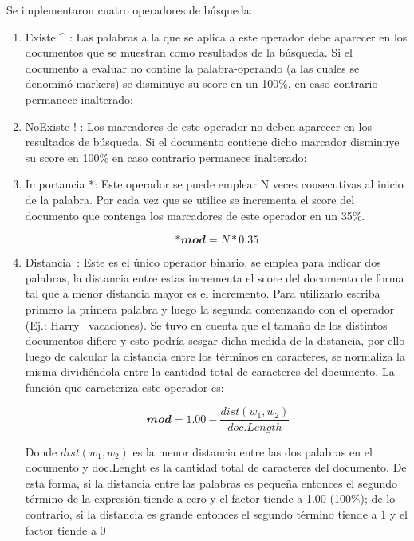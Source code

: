 \documentclass[a4paper,12pt,twocolumn]{article}
\begin{document}
Se implementaron cuatro operadores de búsqueda:
\begin{enumerate}
    \item  Existe ^ : Las palabras a la que se aplica a este operador debe aparecer en los
    documentos que se muestran como resultados de la búsqueda. Si el documento a
    evaluar no contine la palabra-operando (a las cuales se denominó markers) se
    disminuye su score en un 100\%, en caso contrario permanece inalterado:

    \item NoExiste ! : Los marcadores de este operador no deben aparecer en los resultados de
    búsqueda. Si el documento contiene dicho marcador disminuye su score en 100\% en
    caso contrario permanece inalterado:

    \item Importancia *: Este operador se puede emplear N veces consecutivas al inicio de la
    palabra. Por cada vez que se utilice se incrementa el score del documento que contenga
    los marcadores de este operador en un 35\%.
        \begin{center}
        \begin{equation}
            *𝒎𝒐𝒅 = N * 0.35
        \end{equation}
        \end{center}

    \item Distancia~: Este es el único operador binario, se emplea para indicar dos palabras, la
    distancia entre estas incrementa el score del documento de forma tal que a menor
    distancia mayor es el incremento. Para utilizarlo escriba primero la primera palabra y
    luego la segunda comenzando con el operador (Ej.: Harry ~vacaciones).
    Se tuvo en cuenta que el tamaño de los distintos documentos difiere y esto podría sesgar
    dicha medida de la distancia, por ello luego de calcular la distancia entre los términos en
    caracteres, se normaliza la misma dividiéndola entre la cantidad total de caracteres del
    documento. La función que caracteriza este operador es:
        \begin{center}
        \begin{equation}
            ~𝒎𝒐𝒅 = 1.00 - \frac{dist(w_1,w_2)}{doc.Length}
        \end{equation}
        \end{center}
    Donde $dist(w_1, w_2)$ es la menor distancia entre las dos palabras en el
    documento y doc.Lenght es la cantidad total de caracteres del documento.
    De esta forma, si la distancia entre las palabras es pequeña entonces el segundo término
    de la expresión tiende a cero y el factor tiende a 1.00 (100\%); de lo contrario, si la
    distancia es grande entonces el segundo término tiende a 1 y el factor tiende a 0%

\end{enumerate} 
\end{document}
